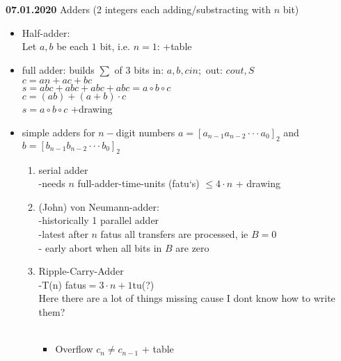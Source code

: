 \documentclass[a4paper, 11pt]{report}
\theoremstyle{break}
\theoremstyle{proofstyle}
\begin{document}
    \textbf{07.01.2020} Adders (2 integers each adding/substracting with $n$ bit)\\
    \begin{itemize}
        \item Half-adder: \\
        Let $a,b$ be each $1$ bit, i.e. $n=1$: +table \\
        \item full adder: builds $\sum$ of $3$ bits in: $a,b,cin;$ out: $cout, S$ \\
        $c=an+ac+bc$ \\
        $s=abc+abc+abc+abc=a\circ b\circ c$ \\
        $c=(ab)+(a+b)\cdot c$\\
        $s=a\circ b\circ c$ +drawing 
        
        \item simple adders for $n-$digit numbers $a=[a_{n-1}a_{n-2}\cdot \cdot \cdot a_0]_2$ and $b=[b_{n-1}b_{n-2}\cdot \cdot \cdot b_0]_2$
        \begin{enumerate}
            \item serial adder \\
            -needs $n$ full-adder-time-units (fatu`s) $\leqslant 4\cdot n$ + drawing
            \item (John) von Neumann-adder: \\
            -historically 1 parallel adder \\
            -latest after $n$ fatus all transfers are processed, ie $B=0$ \\
            - early abort when all bits in $B$ are zero
            
            \item Ripple-Carry-Adder \\
            -T(n) fatus$=3\cdot n+1$tu(?) \\
            Here there are a lot of things missing cause I dont know how to write them?\\
            \\
            \begin{itemize}
                \item Overflow \iff $c_n\not=c_{n-1}$ + table
                

\end{itemize}
\end{enumerate}
\end{itemize}
\end{document}
